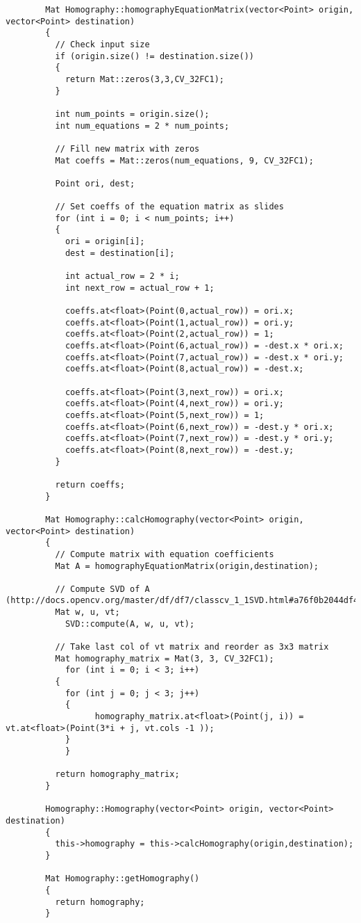 \documentclass[a4paper, 11pt]{article}
\theoremstyle{definition}
\begin{document}
      \begin{lstlisting}
        Mat Homography::homographyEquationMatrix(vector<Point> origin, vector<Point> destination)
        {
          // Check input size
          if (origin.size() != destination.size())
          {
            return Mat::zeros(3,3,CV_32FC1);
          }

          int num_points = origin.size();
          int num_equations = 2 * num_points;

          // Fill new matrix with zeros
          Mat coeffs = Mat::zeros(num_equations, 9, CV_32FC1);

          Point ori, dest;

          // Set coeffs of the equation matrix as slides
          for (int i = 0; i < num_points; i++)
          {
            ori = origin[i];
            dest = destination[i];

            int actual_row = 2 * i;
            int next_row = actual_row + 1;

            coeffs.at<float>(Point(0,actual_row)) = ori.x;
            coeffs.at<float>(Point(1,actual_row)) = ori.y;
            coeffs.at<float>(Point(2,actual_row)) = 1;
            coeffs.at<float>(Point(6,actual_row)) = -dest.x * ori.x;
            coeffs.at<float>(Point(7,actual_row)) = -dest.x * ori.y;
            coeffs.at<float>(Point(8,actual_row)) = -dest.x;

            coeffs.at<float>(Point(3,next_row)) = ori.x;
            coeffs.at<float>(Point(4,next_row)) = ori.y;
            coeffs.at<float>(Point(5,next_row)) = 1;
            coeffs.at<float>(Point(6,next_row)) = -dest.y * ori.x;
            coeffs.at<float>(Point(7,next_row)) = -dest.y * ori.y;
            coeffs.at<float>(Point(8,next_row)) = -dest.y;
          }

          return coeffs;
        }

        Mat Homography::calcHomography(vector<Point> origin, vector<Point> destination)
        {
          // Compute matrix with equation coefficients
          Mat A = homographyEquationMatrix(origin,destination);

          // Compute SVD of A (http://docs.opencv.org/master/df/df7/classcv_1_1SVD.html#a76f0b2044df458160292045a3d3714c6)
          Mat w, u, vt;
        	SVD::compute(A, w, u, vt);

          // Take last col of vt matrix and reorder as 3x3 matrix
          Mat homography_matrix = Mat(3, 3, CV_32FC1);
        	for (int i = 0; i < 3; i++)
          {
            for (int j = 0; j < 3; j++)
            {
        		  homography_matrix.at<float>(Point(j, i)) = vt.at<float>(Point(3*i + j, vt.cols -1 ));
            }
        	}

          return homography_matrix;
        }

        Homography::Homography(vector<Point> origin, vector<Point> destination)
        {
          this->homography = this->calcHomography(origin,destination);
        }

        Mat Homography::getHomography()
        {
          return homography;
        }
      \end{lstlisting}
\end{document}
